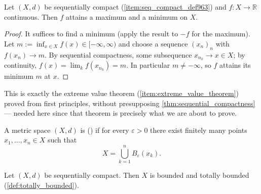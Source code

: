 \begin{lemma}
\label{lem:sequential_compactness_extreme_values}
Let $(X,d)$ be sequentially compact (\cref{item:seq_compact_def963}) and $f : X \to \mathbb{R}$
continuous. Then $f$ attains a maximum and a minimum on $X$.
\end{lemma}

\begin{proof}
It suffices to find a minimum (apply the result to $-f$ for the maximum). Let
$m := \inf_{x\in X} f(x) \in [-\infty,\infty)$ and choose a sequence $(x_n)_{n}$ with
$f(x_n) \to m$. By sequential compactness, some subsequence $x_{n_k} \to x \in X$; by continuity,
$f(x) = \lim_k f(x_{n_k}) = m$. In particular $m \neq -\infty$, so $f$ attains its minimum $m$ at
$x$.
\end{proof}

\begin{remark}
This is exactly the extreme value theorem (\cref{item:extreme_value_theorem}) proved from first
principles, without presupposing \cref{thm:sequential_compactness} --- needed here since that
theorem is precisely what we are about to prove.
\end{remark}

\begin{definition}
\label{def:totally_bounded}
A metric space $(X,d)$ is  () if for
every $\varepsilon > 0$ there exist finitely many points $x_1,\dots,x_n \in X$ such that
\[X = \bigcup_{k=1}^{n} B_\varepsilon(x_k).\]
\end{definition}

\begin{lemma}
\label{lem:sequentially_compact_totally_bounded}
Let $(X,d)$ be sequentially compact. Then $X$ is bounded and totally bounded
(\cref{def:totally_bounded}).
\end{lemma}

